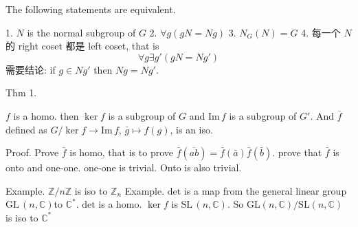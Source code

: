 
The following statements are equivalent. 

1. \(N\) is the normal subgroup of \(G\)
2. \(\forall g (g N =  N g)\)
3. \( N _{G} (N) = G\)
4. 每一个 \(N\) 的 right coset 都是 left coset, that is 
\[
\forall g \exists g ' ( gN  = N g')
\]
需要结论: if \( g \in N g'\) then \( N g = N g'\).

Thm 1. 

\(f\) is a homo. then \(\ker f\) is a subgroup of \(G\) and \(\text{Im}\, f\) is a subgroup of \(G'\). 
And \(\bar f\) defined as \( G /\ker f \to \text{Im}\, f\), \( \bar g \mapsto f(g)\), is an iso.

Proof. Prove \(\bar f\) is homo, that is to prove \(\bar f ( \overline{a b}	) = \bar f (\bar a) \bar f (\bar b)\). 
prove that \(\bar f\) is onto and one-one. one-one is trivial. Onto is also trivial. 

Example. \(\mathbb{Z} / n\mathbb{Z}\) is iso to \( \mathbb{Z}_{n}\)
Example. \(\text{det}\) is a map from the general linear group \(\text{GL}\, (n , \mathbb{C})\)to \(\mathbb{C} ^{*}\). 
\(\text{det}\) is a homo. \(\ker f\) is \( \text{SL}\, (n , \mathbb{C})\). So \( \text{GL} (n , \mathbb{C}) / \text{SL}(n, \mathbb{C})\) is iso to \(\mathbb{C} ^{*}\)


